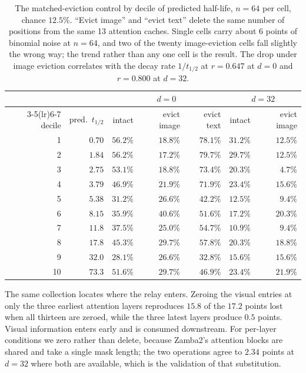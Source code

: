 \documentclass[11pt]{article}
\begin{document}
\begin{table}[h]
\centering\small
\begin{tabular}{rrrrrrr}
\toprule
& & \multicolumn{3}{c}{$d = 0$} & \multicolumn{2}{c}{$d = 32$} \\
\cmidrule(lr){3-5}\cmidrule(lr){6-7}
decile & pred.\ $t_{1/2}$ & intact & evict image & evict text & intact & evict image \\
\midrule
1  & $0.70$ & $56.2\%$ & $18.8\%$ & $78.1\%$ & $31.2\%$ & $12.5\%$ \\
2  & $1.84$ & $56.2\%$ & $17.2\%$ & $79.7\%$ & $29.7\%$ & $12.5\%$ \\
3  & $2.75$ & $53.1\%$ & $18.8\%$ & $73.4\%$ & $20.3\%$ & $4.7\%$  \\
4  & $3.79$ & $46.9\%$ & $21.9\%$ & $71.9\%$ & $23.4\%$ & $15.6\%$ \\
5  & $5.38$ & $31.2\%$ & $26.6\%$ & $42.2\%$ & $12.5\%$ & $9.4\%$  \\
6  & $8.15$ & $35.9\%$ & $40.6\%$ & $51.6\%$ & $17.2\%$ & $20.3\%$ \\
7  & $11.8$ & $37.5\%$ & $25.0\%$ & $54.7\%$ & $10.9\%$ & $9.4\%$  \\
8  & $17.8$ & $45.3\%$ & $29.7\%$ & $57.8\%$ & $20.3\%$ & $18.8\%$ \\
9  & $32.0$ & $28.1\%$ & $26.6\%$ & $32.8\%$ & $15.6\%$ & $15.6\%$ \\
10 & $73.3$ & $51.6\%$ & $29.7\%$ & $46.9\%$ & $23.4\%$ & $21.9\%$ \\
\bottomrule
\end{tabular}
\caption{The matched-eviction control by decile of predicted half-life, $n = 64$
per cell, chance $12.5\%$. ``Evict image'' and ``evict text'' delete the same
number of positions from the same 13 attention caches. Single cells carry about
$6$ points of binomial noise at $n = 64$, and two of the twenty image-eviction
cells fall slightly the wrong way; the trend rather than any one cell is the
result. The drop under image eviction correlates with the decay rate
$1/t_{1/2}$ at $r = 0.647$ at $d{=}0$ and $r = 0.800$ at $d{=}32$.}
\label{tab:controls}
\end{table}

The same collection locates where the relay enters. Zeroing the visual entries
at only the three earliest attention layers reproduces $15.8$ of the $17.2$
points lost when all thirteen are zeroed, while the three latest layers produce
$0.5$ points. Visual information enters early and is consumed downstream. For
per-layer conditions we zero rather than delete, because Zamba2's attention
blocks are shared and take a single mask length; the two operations agree to
$2.34$ points at $d{=}32$ where both are available, which is the validation of
that substitution.
\end{document}
